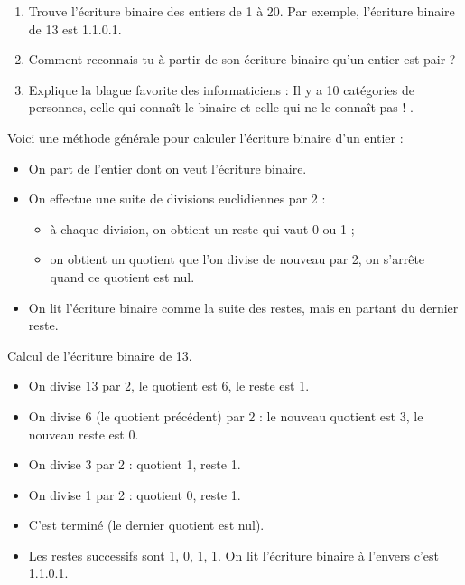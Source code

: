 \documentclass[class=report,crop=false, 12pt]{standalone}
\begin{document}
\begin{activite}
\sauteligne
\begin{enumerate}
  \item Trouve l'écriture binaire des entiers de 1 à 20. Par exemple, l'écriture binaire de 13 est 1.1.0.1.
  \item Comment reconnais-tu à partir de son écriture binaire qu'un entier est pair ?
  \item Explique la blague favorite des informaticiens : \og Il y a 10 catégories de personnes, celle qui connaît le binaire et celle qui ne le connaît pas ! \fg{}.
\end{enumerate}
\end{activite}

\bigskip
\bigskip

Voici une méthode générale pour calculer l'écriture binaire d'un entier :
\begin{itemize}
  \item On part de l'entier dont on veut l'écriture binaire.
  
  \item On effectue une suite de divisions euclidiennes par 2 : 
  \begin{itemize}
    \item à chaque division, on obtient un reste qui vaut 0 ou 1 ; %
    \item on obtient un quotient que l'on divise de nouveau par 2, on s'arrête quand ce quotient est nul.
  \end{itemize}
  
  \item On lit l'écriture binaire comme la suite des restes, mais en partant du dernier reste.
\end{itemize}

\begin{exemple}
Calcul de l'écriture binaire de 13.

\begin{itemize}
  \item On divise 13 par 2, le quotient est 6, le reste est 1.
  \item On divise 6 (le quotient précédent) par 2 : le nouveau quotient est 3, le nouveau reste est 0.
  \item On divise 3 par 2 : quotient 1, reste 1.
  \item On divise 1 par 2 : quotient 0, reste 1.
  \item C'est terminé (le dernier quotient est nul).
  \item Les restes successifs sont 1, 0, 1, 1. On lit l'écriture binaire à l'envers c'est 1.1.0.1.  
\end{itemize}

\end{exemple}
\end{document}
